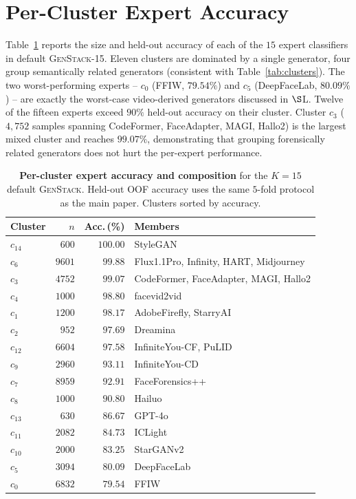 \documentclass[10pt,twocolumn,letterpaper]{article}
\begin{document}
\section{Per-Cluster Expert Accuracy}
\label{sec:per_cluster_acc}

Table~\ref{tab:per_cluster_acc} reports the size and held-out accuracy of each of the $15$ expert classifiers in default \textsc{GenStack-15}. Eleven clusters are dominated by a single generator, four group semantically related generators (consistent with Table~\ref{tab:clusters}). The two worst-performing experts -- $c_0$ (FFIW, $79.54\%$) and $c_5$ (DeepFaceLab, $80.09\%$) -- are exactly the worst-case video-derived generators discussed in $\S$L. Twelve of the fifteen experts exceed $90\%$ held-out accuracy on their cluster. Cluster $c_3$ ($4{,}752$ samples spanning CodeFormer, FaceAdapter, MAGI, Hallo2) is the largest mixed cluster and reaches $99.07\%$, demonstrating that grouping forensically related generators does not hurt the per-expert performance.

\begin{table}[h]
\centering
\footnotesize
\setlength{\tabcolsep}{3pt}
\renewcommand{\arraystretch}{1.05}
\caption{\textbf{Per-cluster expert accuracy and composition} for the $K{=}15$ default \textsc{GenStack}. Held-out OOF accuracy uses the same $5$-fold protocol as the main paper. Clusters sorted by accuracy.}
\label{tab:per_cluster_acc}
\begin{tabular}{l r r p{}}
\toprule
Cluster & $n$ & Acc.\,(\%) & Members \\
\midrule
$c_{14}$ & $600$  & $100.00$ & StyleGAN \\
$c_{6}$  & $9601$ & $99.88$  & Flux1.1Pro, Infinity, HART, Midjourney \\
$c_{3}$  & $4752$ & $99.07$  & CodeFormer, FaceAdapter, MAGI, Hallo2 \\
$c_{4}$  & $1000$ & $98.80$  & facevid2vid \\
$c_{1}$  & $1200$ & $98.17$  & AdobeFirefly, StarryAI \\
$c_{2}$  & $952$  & $97.69$  & Dreamina \\
$c_{12}$ & $6604$ & $97.58$  & InfiniteYou-CF, PuLID \\
$c_{9}$  & $2960$ & $93.11$  & InfiniteYou-CD \\
$c_{7}$  & $8959$ & $92.91$  & FaceForensics++ \\
$c_{8}$  & $1000$ & $90.80$  & Hailuo \\
$c_{13}$ & $630$  & $86.67$  & GPT-4o \\
$c_{11}$ & $2082$ & $84.73$  & ICLight \\
$c_{10}$ & $2000$ & $83.25$  & StarGANv2 \\
$c_{5}$  & $3094$ & $80.09$  & DeepFaceLab \\
$c_{0}$  & $6832$ & $79.54$  & FFIW \\
\bottomrule
\end{tabular}
\end{table}
\end{document}
